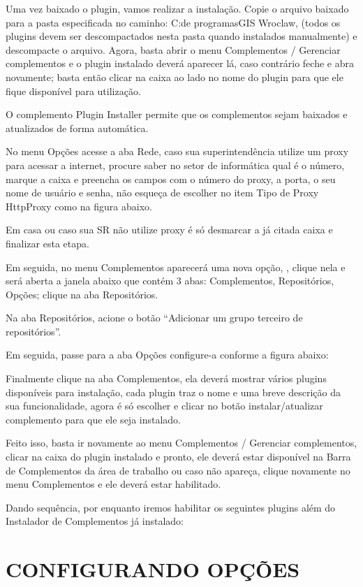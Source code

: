 \documentclass[
  11pt,
  a4paper,
]{book}
\begin{document}
Uma vez baixado o plugin, vamos realizar a instalação. Copie o arquivo
baixado para a pasta especificada no caminho: C:\Arquivos de
programas\Quantum GIS Wroclaw\apps\QGIS\python\plugins, (todos os
plugins devem ser descompactados nesta pasta quando instalados
manualmente) e descompacte o arquivo. Agora, basta abrir o menu
Complementos / Gerenciar complementos e o plugin instalado deverá
aparecer lá, caso contrário feche e abra novamente; basta então clicar
na caixa ao lado no nome do plugin para que ele fique disponível para
utilização.

O complemento Plugin Installer permite que os complementos sejam
baixados e atualizados de forma automática.

No menu Opções acesse a aba Rede, caso sua superintendência utilize um
proxy para acessar a internet, procure saber no setor de informática
qual é o número, marque a caixa e preencha os campos com o número do
proxy, a porta, o seu nome de usuário e senha, não esqueça de escolher
no item Tipo de Proxy HttpProxy como na figura abaixo.

Em casa ou caso sua SR não utilize proxy é só desmarcar a já citada
caixa e finalizar esta etapa.

Em seguida, no menu Complementos aparecerá uma nova opção, , clique nela
e será aberta a janela abaixo que contém 3 abas: Complementos,
Repositórios, Opções; clique na aba Repositórios.

Na aba Repositórios, acione o botão ``Adicionar um grupo terceiro de
repositórios''.

Em seguida, passe para a aba Opções configure-a conforme a figura
abaixo:

Finalmente clique na aba Complementos, ela deverá mostrar vários plugins
disponíveis para instalação, cada plugin traz o nome e uma breve
descrição da sua funcionalidade, agora é só escolher e clicar no botão
instalar/atualizar complemento para que ele seja instalado.

Feito isso, basta ir novamente ao menu Complementos / Gerenciar
complementos, clicar na caixa do plugin instalado e pronto, ele deverá
estar disponível na Barra de Complementos da área de trabalho ou caso
não apareça, clique novamente no menu Complementos e ele deverá estar
habilitado.

Dando sequência, por enquanto iremos habilitar os seguintes plugins além
do Instalador de Complementos já instalado:

\chapter{CONFIGURANDO OPÇÕES}\label{configurando-opuxe7uxf5es}
\end{document}
